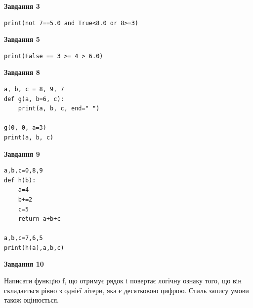 \documentclass[12pt, ukrainian]{article}
\begin{document}
{\begin {large}
\begin{minipage}[t]{7.5cm}
\end{minipage}
\vline \hspace{6mm}
\begin{minipage}[t]{10.5cm}

\begin{center}
\textbf{Завдання 3}
\end{center}

\begin{verbatim}
print(not 7==5.0 and True<8.0 or 8>=3)
\end{verbatim}



\begin{center}
\textbf{Завдання 5}
\end{center}

\begin{verbatim}
print(False == 3 >= 4 > 6.0)
\end{verbatim}



\begin{center}
\textbf{Завдання 8}
\end{center}

\begin{verbatim}
a, b, c = 8, 9, 7
def g(a, b=6, c):
    print(a, b, c, end=" ")

g(0, 0, a=3)
print(a, b, c)
\end{verbatim}



\begin{center}
\textbf{Завдання 9}
\end{center}

\begin{verbatim}
a,b,c=0,8,9
def h(b):
    a=4
    b+=2
    c=5
    return a+b+c

a,b,c=7,6,5
print(h(a),a,b,c)
\end{verbatim}



\begin{center}
\textbf{Завдання 10}
\end{center}

Написати функцiю f, що отримує рядок i повертає логічну ознаку того, що вiн складається рівно з однієї літери, яка є десятковою цифрою. Стиль запису умови також оцінюється.\par

\end{minipage}

\end {large}}
\newpage
\end{document}
